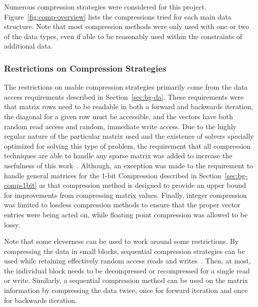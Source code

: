 Numerous compression strategies were considered for this project.
Figure~\ref{fig:comp-overview} lists the compressions tried for each main data structure.
Note that most compression methods were only used with one or two of the data types, even if able to be reasonably used within the constraints of additional data.



\subsubsection{Restrictions on Compression Strategies}
The restrictions on usable compression strategies primarily come from the data access requirements described in Section~\ref{sec:bg-da}.
These requirements were that matrix rows need to be readable in both a forward and backwards iteration, the diagonal for a given row must be accessible, and the vectors have both random read access and random, immediate write access.
Due to the highly regular nature of the particular matrix used and the existence of solvers specially optimized for solving this type of problem, the requirement that all compression techniques are able to handle any sparse matrix was added to increase the usefulness of this work~\cite{Saad:2003:IterativeMethods}.
Although, an exception was made to the requirement to handle general matrices for the 1-bit Compression described in Section~\ref{sec:bg-comp-1bit} as that compression method is designed to provide an upper bound for improvements from compressing matrix values.
Finally, integer compression was limited to lossless compression methods to ensure that the proper vector entries were being acted on, while floating point compression was allowed to be lossy.

Note that some cleverness can be used to work around some restrictions.
By compressing the data in small blocks, sequential compression strategies can be used while retaining effectively random access reads and writes~\cite{Lindstrom:2014:zfp}.
Then, at most, the individual block needs to be decompressed or recompressed for a single read or write.
Similarly, a sequential compression method can be used on the matrix information by compressing the data twice, once for forward iteration and once for backwards iteration.



